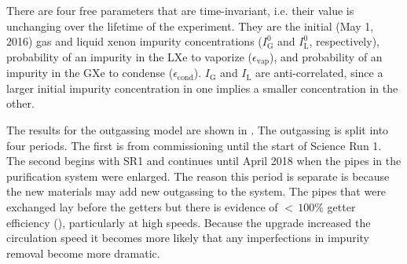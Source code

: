There are four free parameters that are time-invariant, i.e. their value is unchanging over the lifetime of the experiment.  They are the
initial (May 1, 2016) gas and liquid xenon impurity concentrations ($I_{\mathrm{G}}^0$ and $I_{\mathrm{L}}^0$, respectively), probability of
an impurity in the LXe to vaporize ($\epsilon_{\mathrm{vap}}$), and probability of an impurity in the GXe to condense
($\epsilon_{\mathrm{cond}}$).  $I_{\mathrm{G}}$ and $I_{\mathrm{L}}$ are anti-correlated, since a larger initial impurity concentration in
one implies a smaller concentration in the other.

\bgroup
\def\arraystretch{1.2}
\begin{table}
\centering
{}
\caption{Time-independent parameters in the fit.}
\label{tab:elifetime_fit_results_posteriors_constant}
\end{table}
\egroup

The results for the outgassing model are shown in .  The outgassing is split into
four periods.  The first is from commissioning until the start of Science Run 1.  The second begins with SR1 and continues until April
2018 when the pipes in the purification system were enlarged.  The reason this period is separate is because the new materials may add
new outgassing to the system.  The pipes that were exchanged lay before the getters but there is evidence of ${<}\, 100\%$ getter
efficiency (), particularly at high speeds.  Because the upgrade increased the
circulation speed it becomes more likely that any imperfections in impurity removal become more dramatic.

